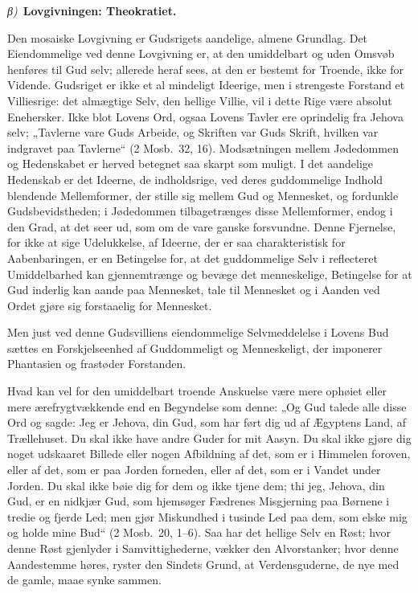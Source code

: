 \documentclass[12pt]{book}
\newcommand{\greekrun}[2]{%
  \medskip\begin{center}{\itshape #1)}\ {\bfseries #2}\end{center}\medskip}
\begin{document}
\greekrun{β}{Lovgivningen: Theokratiet.}

Den mosaiske Lovgivning er Gudsrigets aandelige, almene Grundlag.
Det Eiendommelige ved denne Lovgivning er, at den umiddelbart og
uden Omsvøb henføres til Gud selv; allerede heraf sees, at den er
bestemt for Troende, ikke for Vidende. Gudsriget er ikke et al\-
mindeligt Ideerige, men i strengeste Forstand et Villiesrige: det
almægtige Selv, den hellige Villie, vil i dette Rige være absolut
Enehersker. Ikke blot Lovens Ord, ogsaa Lovens Tavler ere
oprindelig fra Jehova selv; „Tavlerne vare Guds Arbeide, og Skriften
var Guds Skrift, hvilken var indgravet paa Tavlerne“ (2 Mosb.\ 32,
16). Modsætningen mellem Jødedommen og Hedenskabet er herved
betegnet saa skarpt som muligt. I det aandelige Hedenskab er det
Ideerne, de indholdsrige, ved deres guddommelige Indhold blendende
Mellemformer, der stille sig mellem Gud og Mennesket, og fordunkle
Gudsbevidstheden; i Jødedommen tilbagetrænges disse Mellemformer,
endog i den Grad, at det seer ud, som om de vare ganske forsvundne.
Denne Fjernelse, for ikke at sige Udelukkelse, af Ideerne, der er
saa charakteristisk for Aabenbaringen, er en Betingelse for, at det
guddommelige Selv i reflecteret Umiddelbarhed kan gjennemtrænge og
bevæge det menneskelige, Betingelse for at Gud inderlig kan aande
paa Mennesket, tale til Mennesket og i Aanden ved Ordet gjøre sig
forstaaelig for Mennesket.

Men just ved denne Gudsvilliens eiendommelige Selvmeddelelse i
Lovens Bud sættes en Forskjelseenhed af Guddommeligt og
Menneskeligt, der imponerer Phantasien og frastøder Forstanden.

Hvad kan vel for den umiddelbart troende Anskuelse være mere
ophøiet eller mere ærefrygtvækkende end en Begyndelse som denne: „Og
Gud talede alle disse Ord og sagde: Jeg er Jehova, din Gud, som har
ført dig ud af Ægyptens Land, af Trællehuset. Du skal ikke have
andre Guder for mit Aasyn. Du skal ikke gjøre dig noget udskaaret
Billede eller nogen Afbildning af det, som er i Himmelen foroven,
eller af det, som er paa Jorden forneden, eller af det, som er i
Vandet under Jorden. Du skal ikke bøie dig for dem og ikke tjene
dem; thi jeg, Jehova, din Gud, er en nidkjær Gud, som
hjemsøger Fædrenes Misgjerning paa Børnene i tredie og fjerde Led;
men gjør Miskundhed i tusinde Led paa dem, som elske mig og holde
mine Bud“ (2 Mosb.\ 20, 1--6). Saa har det hellige Selv en Røst;
hvor denne Røst gjenlyder i Samvittighederne, vækker den
Alvorstanker; hvor denne Aandestemme høres, ryster den Sindets
Grund, at Verdensguderne, de nye med de gamle, maae synke sammen.
\end{document}
